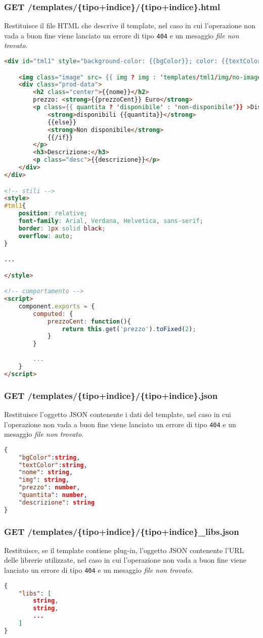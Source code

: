 \subsubsection{GET /templates/\{tipo+indice\}/\{tipo+indice\}.html}
Restituisce il file HTML che descrive il template, nel caso in cui l'operazione non vada a buon fine viene lanciato un errore di tipo \texttt{404} e un mesaggio \textit{file non trovato}.
\begin{lstlisting}[language=HTML, caption=Esempio di template mustache restituito.]
<div id="tml1" style="background-color: {{bgColor}}; color: {{textColor}};">

	<img class="image" src= {{ img ? img : 'templates/tml1/img/no-image.png'}}>
	<div class="prod-data">
		<h2 class="center">{{nome}}</h2>
		prezzo: <strong>{{prezzoCent}} Euro</strong>
		<p class={{ quantita ? 'disponibile' : 'non-disponibile'}} >Disponibilità: {{#if quantita}}
			<strong>disponibili {{quantita}}</strong>
			{{else}}
			<strong>Non disponibile</strong>
			{{/if}}
		</p>
		<h3>Descrizione:</h3>
		<p class="desc">{{descrizione}}</p>
	</div>
</div>

<!-- stili -->
<style>
#tml1{
	position: relative;
	font-family: Arial, Verdana, Helvetica, sans-serif;
	border: 1px solid black;
	overflow: auto;
}

...

</style>

<!-- comportamento -->
<script>
	component.exports = {
		computed: {
			prezzoCent: function(){
				return this.get('prezzo').toFixed(2);
			}
		}
		
		...
	}
</script>
\end{lstlisting}

\subsubsection{GET /templates/\{tipo+indice\}/\{tipo+indice\}.json}
Restituisce l'oggetto JSON contenente i dati del template, nel caso in cui l'operazione non vada a buon fine viene lanciato un errore di tipo \texttt{404} e un mesaggio \textit{file non trovato}.
\begin{lstlisting}[language=JSON, caption=Esempio di oggetto JSON restituito.]
{
	"bgColor":string,
	"textColor":string,
	"nome": string,
	"img": string,
	"prezzo": number,
	"quantita": number,
	"descrizione": string
}
\end{lstlisting}
\subsubsection{GET /templates/\{tipo+indice\}/\{tipo+indice\}\_libs.json}
Restituisce, se il template contiene plug-in, l'oggetto JSON contenente l'URL delle librerie utilizzate, nel caso in cui l'operazione non vada a buon fine viene lanciato un errore di tipo \texttt{404} e un mesaggio \textit{file non trovato}.
\begin{lstlisting}[language=JSON, caption=Esempio di oggetto JSON restituito.]
{
	"libs": [
		string,
		string,
		...
	]
}
\end{lstlisting}

